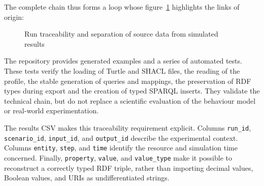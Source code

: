 \documentclass{article}
\begin{document}
The complete chain thus forms a loop whose figure~\ref{fig:simulation-provenance} highlights the links of origin:

\begin{figure}[htbp]
\centering
\caption{Run traceability and separation of source data from simulated results}
\label{fig:simulation-provenance}
\end{figure}

The repository provides generated examples and a series of automated tests. These tests verify the loading of Turtle and SHACL files, the reading of the profile, the stable generation of queries and mappings, the preservation of RDF types during export and the creation of typed SPARQL inserts. They validate the technical chain, but do not replace a scientific evaluation of the behaviour model or real-world experimentation.

The results CSV makes this traceability requirement explicit. Columns \texttt{run\_id}, \texttt{scenario\_id}, \texttt{input\_id}, and \texttt{output\_id} describe the experimental context. Columns \texttt{entity}, \texttt{step}, and \texttt{time} identify the resource and simulation time concerned. Finally, \texttt{property}, \texttt{value}, and \texttt{value\_type} make it possible to reconstruct a correctly typed RDF triple, rather than importing decimal values, Boolean values, and URIs as undifferentiated strings.
\end{document}
